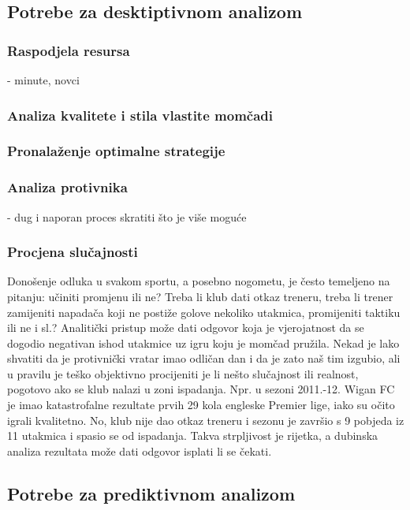 \documentclass{ferseminar}
\begin{document}
\subsection{Potrebe za desktiptivnom analizom}

\subsubsection{Raspodjela resursa}
- minute, novci

\subsubsection{Analiza kvalitete i stila vlastite momčadi}


\subsubsection{Pronalaženje optimalne strategije}


\subsubsection{Analiza protivnika}
- dug i naporan proces skratiti što je više moguće

\subsubsection{Procjena slučajnosti}
Donošenje odluka u svakom sportu, a posebno nogometu, je često temeljeno na pitanju: učiniti promjenu ili ne? Treba li klub dati otkaz treneru, treba li trener zamijeniti napadača koji ne postiže golove nekoliko utakmica, promijeniti taktiku ili ne i sl.? Analitički pristup može dati odgovor koja je vjerojatnost da se dogodio negativan ishod utakmice uz igru koju je momčad pružila. Nekad je lako shvatiti da je protivnički vratar imao odličan dan i da je zato naš tim izgubio, ali u pravilu je teško objektivno procijeniti je li nešto slučajnost ili realnost, pogotovo ako se klub nalazi u zoni ispadanja. Npr. u sezoni 2011.-12. Wigan FC je imao katastrofalne rezultate prvih 29 kola engleske Premier lige, iako su očito igrali kvalitetno. No, klub nije dao otkaz treneru i sezonu je završio s 9 pobjeda iz 11 utakmica i spasio se od ispadanja. Takva strpljivost je rijetka, a dubinska analiza rezultata može dati odgovor isplati li se čekati.

\subsection{Potrebe za prediktivnom analizom}
\end{document}
